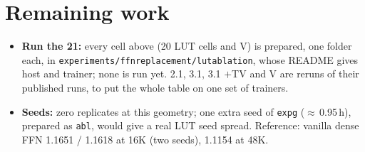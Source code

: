 \documentclass[10pt]{article}
\newcommand{\code}[1]{{\renewcommand{\_}{\textunderscore\allowbreak}\texttt{#1}}}
\begin{document}
\section*{Remaining work}
\begin{itemize}\setlength\itemsep{0pt}
\item \textbf{Run the 21:} every cell above (20 LUT cells and V) is prepared, one folder each, in \code{experiments/ffn\_replacement/lut\_ablation}, whose README gives host and trainer; none is run yet.
  2.1, 3.1, 3.1 $+$TV and V are reruns of their published runs, to put the whole table on one set of trainers.
\item \textbf{Seeds:} zero replicates at this geometry; one extra seed of \code{exp\_g\_0248} ($\approx$\,0.95\,h), prepared as \code{abl\_06}, would give a real LUT seed spread.
  Reference: vanilla dense FFN 1.1651 / 1.1618 at 16K (two seeds), 1.1154 at 48K.
\end{itemize}
\end{document}
